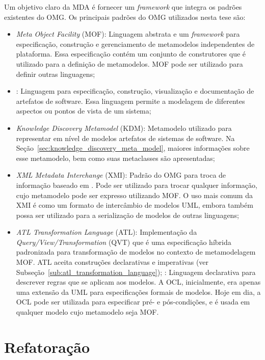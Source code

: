 Um objetivo claro da MDA é fornecer um \textit{framework} que integra os padrões existentes do OMG. Os principais padrões do OMG utilizados nesta tese são:

\begin{itemize}
\item \textit{Meta Object Facility} (MOF): Linguagem abstrata e um \textit{framework} para especificação, construção e gerenciamento de metamodelos independentes de plataforma. Essa especificação contém um conjunto de construtores que é utilizado para a definição de metamodelos. MOF pode ser utilizado para definir outras linguagens;
\item {}: Linguagem para especificação, construção, visualização e documentação de artefatos de software. Essa linguagem permite a modelagem de diferentes aspectos ou pontos de vista de um sistema;
\item \textit{Knowledge Discovery Metamodel} (KDM): Metamodelo utilizado para representar em nível de modelos artefatos de sistemas de software. Na Seção~\ref{sec:knowledge_discovery_meta_model}, maiores informações sobre esse metamodelo, bem como suas metaclasses são apresentadas;
\item \textit{XML Metadata Interchange} (XMI): Padrão do OMG para troca de informação baseado em . Pode ser utilizado para trocar qualquer informação, cujo metamodelo pode ser expresso utilizando MOF. O uso mais comum da XMI é como um formato de intercâmbio de modelos UML, embora também possa ser utilizado para a serialização de modelos de outras linguagens;
\item \textit{ATL Transformation Language} (ATL): Implementação da \textit{Query/View/Transformation} (QVT) que é uma especificação híbrida padronizada para transformação de modelos no contexto de metamodelagem MOF. ATL aceita construções declarativas e imperativas (ver Subseção~\ref{sub:atl_transformation_language});
: Linguagem declarativa para descrever regras que se aplicam aos modelos. A OCL, inicialmente, era apenas uma extensão da UML para especificações formais de modelos. Hoje em dia, a OCL pode ser utilizada para especificar pré- e pós-condições, e é usada em qualquer modelo cujo metamodelo seja MOF.
\end{itemize}

\section{Refatoração}\label{sec:refatoracao}

